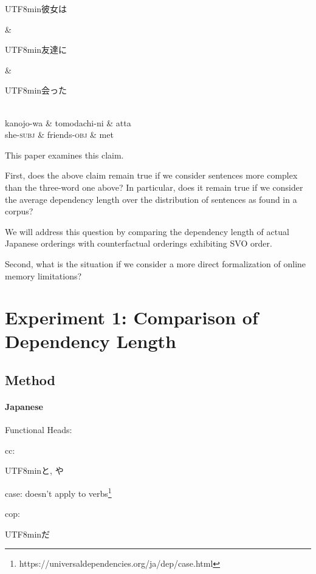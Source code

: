 \documentclass[11pt,a4paper]{article}
\newcommand{\japanese}[1]{\begin{CJK}{UTF8}{min}#1\end{CJK}}
\begin{document}
\begin{centering}
\begin{dependency}[theme = simple]
   \begin{deptext}[column sep=1em]
          \japanese{彼女は} \& \japanese{友達に} \& \japanese{会った}  \\
          kanojo-wa \& tomodachi-ni \& atta \\ 
          she-\textsc{subj} \& friends-\textsc{obj} \& met \\
   \end{deptext}
\end{dependency}
\end{centering}


This paper examines this claim.

First, does the above claim remain true if we consider sentences more complex than the three-word one above?
In particular, does it remain true if we consider the average dependency length over the distribution of sentences as found in a corpus?

We will address this question by comparing the dependency length of actual Japanese orderings with counterfactual orderings exhibiting SVO order.

Second, what is the situation if we consider a more direct formalization of online memory limitations?


\section{Experiment 1: Comparison of Dependency Length}

\subsection{Method}

\paragraph{Japanese}

Functional Heads:

cc: \begin{CJK}{UTF8}{min}と, や\end{CJK} 

case: doesn't apply to verbs\footnote{https://universaldependencies.org/ja/dep/case.html}

cop: \begin{CJK}{UTF8}{min}だ\end{CJK} 
\end{document}
